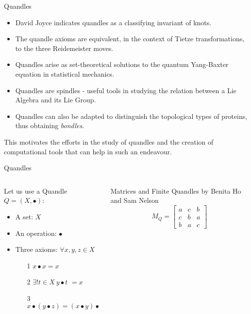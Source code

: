 \begin{frame}{Quandles}
    \begin{itemize}
        \item David Joyce indicates quandles as a classifying invariant of knots.
        \item The quandle axioms are equivalent, in the context of Tietze transformations, to the three Reidemeister moves. 
        \item Quandles arise as set-theoretical solutions to the quantum Yang-Baxter equation in statistical mechanics. 
        \item Quandles are spindles - useful tools in studying the relation between a Lie Algebra and its Lie Group. \item Quandles can also be adapted to distinguish the topological types of proteins, thus obtaining \emph{bondles}. 
    \end{itemize}
    This motivates the efforts in the study of quandles and the creation of computational tools that can help in such an endeavour.
\end{frame}
\begin{frame}{Quandles}

\small

\begin{columns}
\begin{column}{0.5\textwidth}
 Let us use a Quandle $Q = (X, \bullet)$:
 \begin{itemize}
    \item A set: $ X$
    \item An operation: $\bullet$
    \item Three axioms: $\forall x, y, z \in X$\begin{itemize}
        \pause
        \item[1] $x \bullet  x = x$
        \pause
        \item[2]   $\exists! t \in X~y \bullet t$ $= x$ \pause
        \item[3] $ 
        x \bullet (y \bullet z) = (x \bullet y) \bullet (x \bullet z) 
        $ 
    \end{itemize}
    
\end{itemize}
\end{column}
\begin{column}{0.5\textwidth}  
\pause
\tiny Matrices and Finite Quandles by Benita Ho and Sam Nelson
\Large
\[M_Q = \begin{bmatrix}
a& c & b \\
c & b & a\\
b & a& c
\end{bmatrix}\]

\end{column}
\end{columns}
\end{frame}

